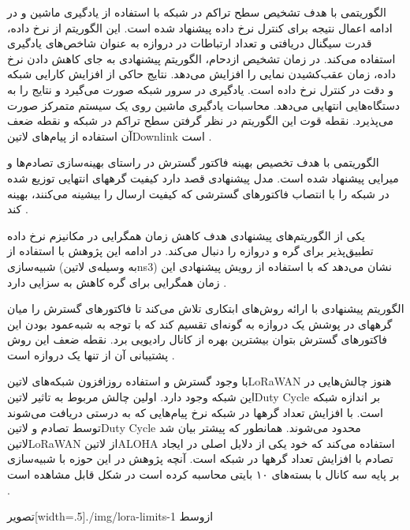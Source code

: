 الگوریتمی با هدف تشخیص سطح تراکم در شبکه با استفاده از یادگیری ماشین و در ادامه اعمال نتیجه برای کنترل نرخ داده پیشنهاد شده است.
این الگوریتم از نرخ داده، قدرت سیگنال دریافتی و تعداد ارتباطات در دروازه به عنوان شاخص‌های یادگیری استفاده می‌کند.
در زمان تشخیص ازدحام، الگوریتم پیشنهادی به جای کاهش دادن نرخ داده، زمان عقب‌کشیدن نمایی را افزایش می‌دهد.
نتایج حاکی از افزایش کارایی شبکه و دقت در کنترل نرخ داده است. یادگیری در سرور شبکه صورت می‌گیرد و نتایج را به دستگاه‌هایی انتهایی می‌دهد.
محاسبات یادگیری ماشین روی یک سیستم متمرکز صورت می‌پذیرد. نقطه قوت این الگوریتم در نظر گرفتن سطح تراکم در شبکه و نقطه ضعف آن استفاده
از پیام‌های ‌لاتین{Downlink} است
.

الگوریتمی با هدف تخصیص بهینه فاکتور گسترش در راستای بهینه‌سازی تصادم‌ها و میرایی پیشنهاد شده است.
مدل پیشنهادی قصد دارد کیفیت گرههای انتهایی توزیع شده در شبکه را با انتصاب فاکتورهای گسترشی که کیفیت ارسال را بیشینه می‌کنند، بهینه کند
.

یکی از الگوریتم‌های پیشنهادی هدف کاهش زمان همگرایی در مکانیزم نرخ داده تطبیق‌پذیر برای گره و دروازه را دنبال می‌کند.
در ادامه این پژوهش با استفاده از شبیه‌سازی (به وسیله‌ی ‌لاتین{ns3}) نشان می‌دهد که با استفاده از رویش پیشنهادی این زمان همگرایی برای گره کاهش به سزایی دارد
.

الگوریتم پیشنهادی با ارائه روش‌های ابتکاری تلاش می‌کند تا فاکتورهای گسترش را میان گرههای در پوشش یک دروازه به گونه‌ای تقسیم کند
که با توجه به شبه‌عمود بودن این فاکتورهای گسترش بتوان بیشترین بهره از کانال رادیویی برد. نقطه ضعف این روش پشتیبانی آن از تنها یک دروازه
است
.


با وجود گسترش و استفاده روزافزون شبکه‌های ‌لاتین{LoRaWAN} هنوز چالش‌هایی در این شبکه وجود دارد. اولین چالش مربوط به تاثیر
‌لاتین{Duty Cycle} بر اندازه شبکه است. با افزایش تعداد گرهها در شبکه نرخ پیام‌هایی که به درستی دریافت می‌شوند توسط تصادم و
‌لاتین{Duty Cycle} محدود می‌شوند. همانطور که پیشتر بیان شد ‌لاتین{LoRaWAN} از ‌لاتین{ALOHA} استفاده می‌کند
که خود یکی از دلایل اصلی در ایجاد تصادم با افزایش تعداد گرهها در شبکه است. آنچه پژوهش  در این حوزه
با شبیه‌سازی بر پایه سه کانال با بسته‌های ۱۰ بایتی محاسبه کرده است در شکل  قابل مشاهده است
.

‌تصویر[width=.5\textwidth]{./img/lora-limits-1}
‌ازوسط

